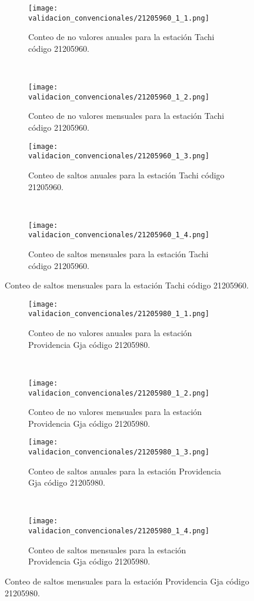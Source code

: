 \begin{figure}[H]\ContinuedFloat
\centering
	\begin{subfigure}[normla]{0.4\textwidth}
	\texttt{[image: validacion\_convencionales/21205960\_1\_1.png]}
		\caption{Conteo de no valores anuales para la estación Tachi código 21205960.}
		\label{subfig:a1}
		\end{subfigure}
		~
    \begin{subfigure}[normla]{0.4\textwidth}
	\texttt{[image: validacion\_convencionales/21205960\_1\_2.png]}
		\caption{Conteo de no valores mensuales para la estación Tachi código 21205960.}
		\label{subfig:a2}
		\end{subfigure}
		
    \begin{subfigure}[normla]{0.4\textwidth}
	\texttt{[image: validacion\_convencionales/21205960\_1\_3.png]}
		\caption{Conteo de saltos anuales para la estación Tachi código 21205960.}
		\label{subfig:a1}
		\end{subfigure}
		~
    \begin{subfigure}[normla]{0.4\textwidth}
	\texttt{[image: validacion\_convencionales/21205960\_1\_4.png]}
		\caption{Conteo de saltos mensuales para la estación Tachi código 21205960.}
		\label{subfig:a2}
		\end{subfigure}

	
\end{figure}
           
\begin{figure}[H]\ContinuedFloat
\centering
	\begin{subfigure}[normla]{0.4\textwidth}
	\texttt{[image: validacion\_convencionales/21205980\_1\_1.png]}
		\caption{Conteo de no valores anuales para la estación Providencia Gja código 21205980.}
		\label{subfig:a1}
		\end{subfigure}
		~
    \begin{subfigure}[normla]{0.4\textwidth}
	\texttt{[image: validacion\_convencionales/21205980\_1\_2.png]}
		\caption{Conteo de no valores mensuales para la estación Providencia Gja código 21205980.}
		\label{subfig:a2}
		\end{subfigure}
		
    \begin{subfigure}[normla]{0.4\textwidth}
	\texttt{[image: validacion\_convencionales/21205980\_1\_3.png]}
		\caption{Conteo de saltos anuales para la estación Providencia Gja código 21205980.}
		\label{subfig:a1}
		\end{subfigure}
		~
    \begin{subfigure}[normla]{0.4\textwidth}
	\texttt{[image: validacion\_convencionales/21205980\_1\_4.png]}
		\caption{Conteo de saltos mensuales para la estación Providencia Gja código 21205980.}
		\label{subfig:a2}
		\end{subfigure}

	
\end{figure}
           
